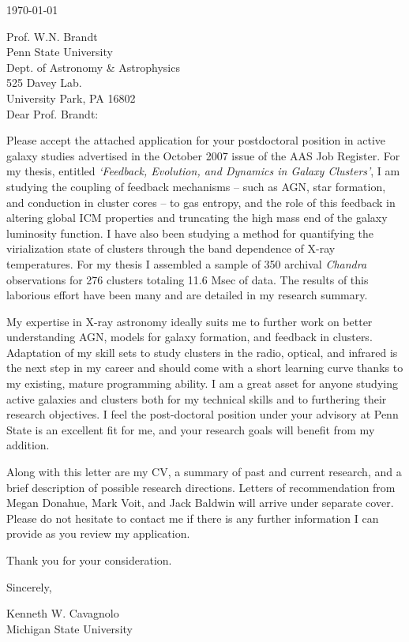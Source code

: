 \documentclass[11pt]{article}
\begin{document}
\today

Prof. W.N. Brandt\\
Penn State University\\
Dept. of Astronomy \& Astrophysics\\
525 Davey Lab.\\
University Park, PA 16802\\

Dear Prof. Brandt:

Please accept the attached application for your postdoctoral
position in active galaxy studies advertised in the October 2007 issue
of the AAS Job Register. For my thesis, entitled {\textit{`Feedback,
Evolution, and Dynamics in Galaxy Clusters'}}, I am studying
the coupling of feedback mechanisms -- such as AGN, star formation, and
conduction in cluster cores -- to gas entropy, and the role
of this feedback in altering global ICM properties and truncating the
high mass end of the galaxy luminosity function. I have also been
studying a method for quantifying the virialization state of clusters
through the band dependence of X-ray temperatures. For my thesis I
assembled a sample of 350 archival {\textit{Chandra}} observations for
276 clusters totaling 11.6 Msec of data. The results of this laborious
effort have been many and are detailed in my research summary.

My expertise in X-ray astronomy ideally suits me to further work on
better understanding AGN, models for galaxy formation, and feedback in
clusters. Adaptation of my skill sets to study clusters
in the radio, optical, and infrared is the next step in my
career and should come with a short learning curve thanks to my
existing, mature programming ability. I am a great asset for anyone
studying active galaxies and clusters both for my technical skills and
to furthering their research objectives. I feel the post-doctoral
position under your advisory at Penn State is an excellent fit for me,
and your research goals will benefit from my addition.

Along with this letter are my CV, a summary of past and
current research, and a brief description of possible research
directions. Letters of recommendation from Megan Donahue, Mark Voit,
and Jack Baldwin will arrive under separate cover. Please do not
hesitate to contact me if there is any further information I can
provide as you review my application.

Thank you for your consideration.

Sincerely,\\
\begin{minipage}{7.5in}
\end{minipage}
Kenneth W. Cavagnolo\\
Michigan State University
\end{document}
